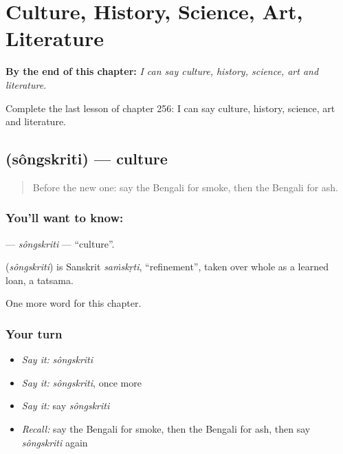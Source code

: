 
\chapter{Culture, History, Science, Art, Literature}
\label{ch:bn-culture-history-science-art-literature}

\begin{chapteropening}
\textbf{By the end of this chapter:} \emph{I can say culture, history, science, art and literature.}

Complete the last lesson of chapter 256: I can say culture, history, science, art and literature.
\end{chapteropening}

\section[\texorpdfstring{\bn{সংস্কৃতি} (sôngskriti)}{সংস্কৃতি (sôngskriti)}]{ (sôngskriti) — culture}

\label{lesson:BN-C256-songskriti}



\begin{quote}
Before the new one: say the Bengali for smoke, then the Bengali for ash.
\end{quote}

\subsection*{You'll want to know: }
\textbf{} — \emph{sôngskriti} — \textquotedblleft{}culture\textquotedblright{}.

\begin{cousinweb}
\textbf{} (\emph{sôngskriti}) is Sanskrit \emph{saṁskṛti}, \textquotedblleft{}refinement\textquotedblright{}, taken over whole as a learned loan, a tatsama.
\end{cousinweb}

\begin{grammarlens}[title={What you've built}]
One more word for this chapter.
\end{grammarlens}

\subsection*{Your turn}
\begin{itemize}
\raggedright
  \item \emph{Say it:} \emph{sôngskriti}
  \item \emph{Say it:} \emph{sôngskriti}, once more
  \item \emph{Say it:} say \emph{sôngskriti}
  \item \emph{Recall:} say the Bengali for smoke, then the Bengali for ash, then say \emph{sôngskriti} again
\end{itemize}


